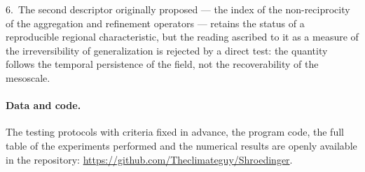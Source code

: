 \documentclass[11pt,a4paper]{article}
\begin{document}
6.~The second descriptor originally proposed --- the index of the non-reciprocity of the aggregation and refinement operators --- retains the status of a reproducible regional characteristic, but the reading ascribed to it as a measure of the irreversibility of generalization is rejected by a direct test: the quantity follows the temporal persistence of the field, not the recoverability of the mesoscale.

\paragraph{Data and code.} The testing protocols with criteria fixed in advance, the program code, the full table of the experiments performed and the numerical results are openly available in the repository: \url{https://github.com/Theclimateguy/Shroedinger}.

\printbibliography[title={References}]
\end{document}
